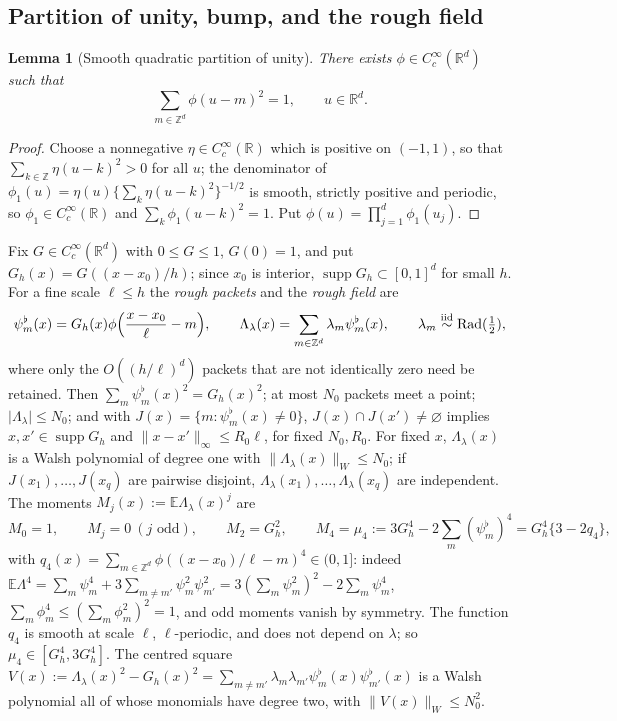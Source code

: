 \documentclass[11pt]{article}
\newtheorem{lemma}[lemma]{Lemma}
\DeclareMathOperator{\Rad}{Rad}
\DeclareMathOperator{\supp}{supp}
\newcommand{\E}{\mathbb{E}}
\newcommand{\R}{\mathbb{R}}
\newcommand{\norm}[1]{\lVert #1\rVert}
\newcommand{\abs}[1]{\lvert #1\rvert}
\begin{document}
\subsection{Partition of unity, bump, and the rough field}
\begin{lemma}[Smooth quadratic partition of unity]\label{lem:partition}
There exists \(\phi\in C_c^\infty(\R^d)\) such that
\begin{equation}
 \sum_{m\in\mathbb Z^d}\phi(u-m)^2=1,\qquad u\in\R^d .
 \label{eq:quadratic-pu}
\end{equation}
\end{lemma}
\begin{proof}
Choose a nonnegative \(\eta\in C_c^\infty(\R)\) which is positive on
\((-1,1)\), so that \(\sum_{k\in\mathbb Z}\eta(u-k)^2>0\) for all \(u\); the
denominator of \(\phi_1(u)=\eta(u)\{\sum_k\eta(u-k)^2\}^{-1/2}\) is smooth,
strictly positive and periodic, so \(\phi_1\in C_c^\infty(\R)\) and
\(\sum_k\phi_1(u-k)^2=1\).  Put \(\phi(u)=\prod_{j=1}^d\phi_1(u_j)\).
\end{proof}
Fix \(G\in C_c^\infty(\R^d)\) with \(0\le G\le1\), \(G(0)=1\), and put
\(G_h(x)=G((x-x_0)/h)\); since \(x_0\) is interior, \(\supp G_h\subset[0,1]^d\)
for small \(h\).  For a fine scale \(\ell\le h\) the \emph{rough packets}
and the \emph{rough field} are
\begin{equation}
 \psi^\flat_m(x)=G_h(x)\phi\Bigl(\frac{x-x_0}\ell-m\Bigr),\qquad
 \Lambda_\lambda(x)=\sum_{m\in\mathbb Z^d}\lambda_m\psi^\flat_m(x),\qquad
 \lambda_m\stackrel{\rm iid}\sim\Rad(\tfrac12),
 \label{eq:rough}
\end{equation}
where only the \(O((h/\ell)^d)\) packets that are not identically zero
need be retained.  Then \(\sum_m\psi^\flat_m(x)^2=G_h(x)^2\); at most
\(N_0\) packets meet a point; \(\abs{\Lambda_\lambda}\le N_0\); and with
\(J(x)=\{m:\psi^\flat_m(x)\ne0\}\), \(J(x)\cap J(x')\ne\varnothing\) implies
\(x,x'\in\supp G_h\) and \(\norm{x-x'}_\infty\le R_0\ell\), for fixed
\(N_0,R_0\).  For fixed \(x\), \(\Lambda_\lambda(x)\) is a Walsh polynomial
of degree one with \(\norm{\Lambda_\lambda(x)}_W\le N_0\); if
\(J(x_1),\dots,J(x_q)\) are pairwise disjoint, \(\Lambda_\lambda(x_1),\dots,\Lambda_\lambda(x_q)\)
are independent.  The moments \(M_j(x):=\E\Lambda_\lambda(x)^j\) are
\begin{equation}
 M_0=1,\qquad M_j=0\ (j\text{ odd}),\qquad M_2=G_h^2,\qquad
 M_4=\mu_4:=3G_h^4-2\sum_m(\psi^\flat_m)^4=G_h^4\{3-2q_4\},
 \label{eq:rough-moments}
\end{equation}
with \(q_4(x)=\sum_{m\in\mathbb Z^d}\phi((x-x_0)/\ell-m)^4\in(0,1]\): indeed
\(\E\Lambda^4=\sum_m\psi_m^4+3\sum_{m\ne m'}\psi_m^2\psi_{m'}^2
=3(\sum_m\psi_m^2)^2-2\sum_m\psi_m^4\), \(\sum_m\phi_m^4\le(\sum_m\phi_m^2)^2=1\),
and odd moments vanish by symmetry.  The function \(q_4\) is smooth at
scale \(\ell\), \(\ell\)-periodic, and does not depend on \(\lambda\); so
\(\mu_4\in[G_h^4,3G_h^4]\).  The centred square
\(V(x):=\Lambda_\lambda(x)^2-G_h(x)^2=\sum_{m\ne m'}\lambda_m\lambda_{m'}\psi^\flat_m(x)\psi^\flat_{m'}(x)\)
is a Walsh polynomial all of whose monomials have degree two, with
\(\norm{V(x)}_W\le N_0^2\).
\end{document}
